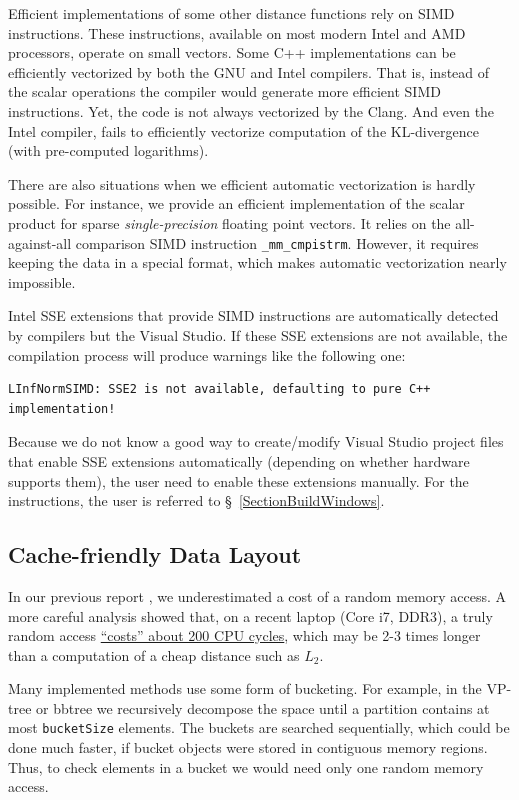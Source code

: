 \documentclass[runningheads,a4paper]{llncs}
\newcommand{\ttt}[1]{\texttt{#1}}
\begin{document}
Efficient implementations of some other distance functions 
rely on SIMD instructions. 
These instructions, available on most modern Intel and AMD processors, 
operate on small vectors. 
Some C++ implementations can be efficiently vectorized by both the GNU and Intel compilers.
That is, instead of the scalar operations the compiler would generate
more efficient SIMD instructions.
Yet, the code is not always vectorized by the Clang.
And even the Intel compiler, fails to efficiently vectorize 
computation of the KL-divergence (with pre-computed logarithms).

There are also situations when we efficient automatic vectorization
is hardly possible. For instance,
we provide an efficient implementation of the scalar product
for sparse \emph{single-precision} floating point vectors.
It relies on the all-against-all comparison SIMD instruction \texttt{\_mm\_cmpistrm}. 
However, it requires keeping the data in a special format,
which makes automatic vectorization nearly impossible.

Intel SSE extensions that provide SIMD instructions are automatically detected
by compilers but the Visual Studio.
If these SSE extensions are not available, the compilation process will produce warnings like the
following one:
{
\footnotesize
\begin{verbatim}
LInfNormSIMD: SSE2 is not available, defaulting to pure C++ implementation!
\end{verbatim}
}
Because we do not know a good way to create/modify Visual Studio project files 
that enable SSE extensions automatically (depending on whether hardware supports them),
the user need to enable these extensions manually. 
For the instructions, the user is referred to \S~\ref{SectionBuildWindows}.

\subsection{Cache-friendly Data Layout}
In our previous report \cite{Boytsov_and_Bilegsaikhan:sisap2013},
we underestimated a cost of a random memory access.
A more careful analysis showed that, 
on a recent laptop (Core i7, DDR3), 
a truly random access \href{http://searchivarius.org/blog/main-memory-similar-hard-drive}{``costs'' about 200 CPU cycles},
which may be 2-3 times longer than a computation of a cheap distance such as $L_2$.

Many implemented methods use some form of bucketing.
For example, in the VP-tree or bbtree we recursively decompose the space
until a partition contains at most \ttt{bucketSize} elements.
The buckets are searched sequentially,
which could be done much faster, if bucket objects were stored
in contiguous memory regions.
Thus, to check elements in a bucket we would need only one random memory access.
\end{document}
